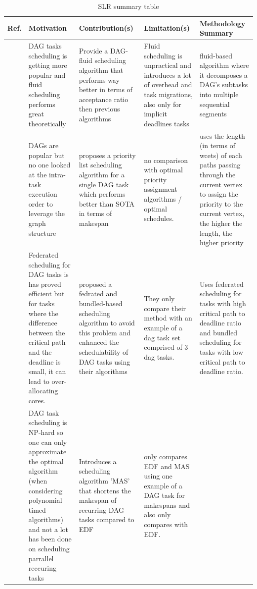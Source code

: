 \begin{table}
    \centering
    \caption{SLR summary table}
    \label{tab:slt_sum_table}
    \begin{tabular}[]{|p{0.15in}|p{1.6in}|p{1.6in}|p{1.6in}|p{1.6in}|}
        \hline
        \textbf{Ref.} & \textbf{Motivation} & \textbf{Contribution(s)} & \textbf{Limitation(s)} & \textbf{Methodology Summary}\\
        \hline
        \cite{guan2021DAGfluid} & DAG tasks scheduling is getting more popular and fluid scheduling performs great theoretically & Provide a DAG-fluid scheduling algorithm
        that performs way better in terms of acceptance ratio then previous algorithms & Fluid scheduling is unpractical and introduces a lot of overhead and task migrations, also only for implicit deadlines tasks
        & fluid-based algorithm where it decomposes a DAG's subtasks into multiple sequential segments\\
        \hline
        \cite{He2019DagIntra} & DAGs are popular but no one looked at the intra-task execution order to leverage the graph structure & proposes a priority list scheduling algorithm for a single DAG task
        which performs better than SOTA in terms of makespan & no comparison with optimal priority assignment algorithms / optimal schedules.  & uses the length (in terms of wcets) of each paths passing through the current vertex to assign the priority to the current vertex,
        the higher the length, the higher priority \\
        \hline
        \cite{Kobayashi2023FedBundledDagsched} & Federated scheduling for DAG tasks is has proved efficient but 
        for tasks where the difference between the critical path and the deadline is small, it
        can lead to over-allocating cores.  & proposed a fedrated and bundled-based scheduling algorithm to avoid this problem and enhanced the schedulability of DAG tasks using their algorithms & They only compare their method with an example of a dag task set comprised of 3 dag tasks. & Uses federated scheduling for tasks with high critical path to deadline ratio and bundled scheduling for tasks with low critical path to deadline ratio. \\
        \hline
        \cite{Xiao2019} & DAG task scheduling is NP-hard so one can only approximate the optimal algorithm (when considering polynomial timed algorithms)
        and not a lot has been done on scheduling parrallel reccuring tasks & Introduces a scheduling algorithm 'MAS' that shortens the makespan of recurring DAG tasks compared to EDF & only compares EDF and MAS using one example of a DAG task for makespans and also only compares with EDF.

\end{tabular}
\end{table}
